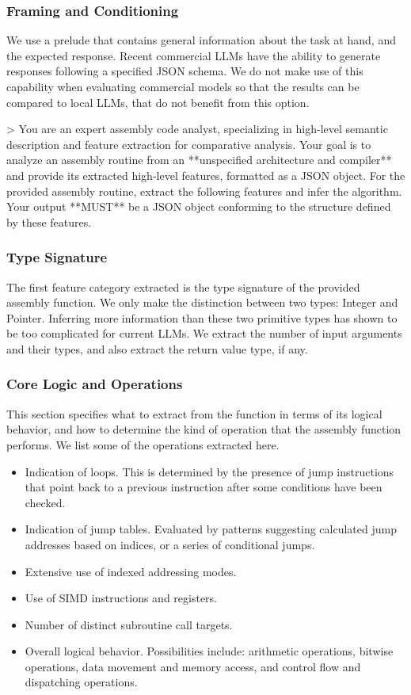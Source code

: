 \documentclass[conference,compsoc]{IEEEtran}
\begin{document}
\subsubsection{Framing and Conditioning}

We use a prelude that contains general information about the task at hand, and the expected response.
Recent commercial LLMs have the ability to generate responses following a specified JSON schema. We do not
make use of this capability when evaluating commercial models so that the results can be compared to local LLMs,
that do not benefit from this option.

> You are an expert assembly code analyst, specializing in high-level semantic description and feature extraction for comparative
analysis. Your goal is to analyze an assembly routine from an **unspecified architecture and compiler** and provide its extracted
high-level features, formatted as a JSON object. For the provided assembly routine, extract the following features and infer the
algorithm. Your output **MUST** be a JSON object conforming to the structure defined by these features.

\subsubsection{Type Signature}

The first feature category extracted is the type signature of the provided assembly function.
We only make the distinction between two types: Integer and Pointer. Inferring more information than these two 
primitive types has shown to be too complicated for current LLMs. We extract the number of input arguments
and their types, and also extract the return value type, if any.

\subsubsection{Core Logic and Operations}

This section specifies what to extract from the function in terms of its logical behavior, and how to determine the kind of
operation that the assembly function performs. We list some of the operations extracted here.


\begin{itemize}
\item Indication of loops. This is determined by the presence of jump instructions that point back to a previous
instruction after some conditions have been checked.
\item Indication of jump tables. Evaluated by patterns suggesting calculated jump addresses based on
indices, or a series of conditional jumps.
\item Extensive use of indexed addressing modes.
\item Use of SIMD instructions and registers.
\item Number of distinct subroutine call targets.
\item Overall logical behavior. Possibilities include: arithmetic operations, bitwise operations, data movement and memory access,
and control flow and dispatching operations.
\end{itemize}
\end{document}
